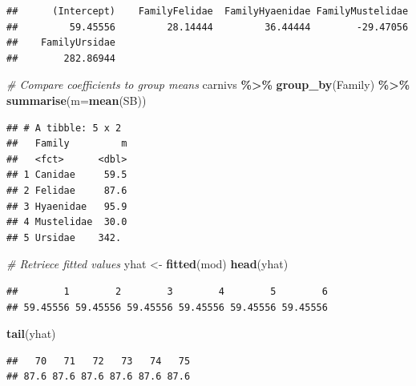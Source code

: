 \documentclass[
]{article}
\newenvironment{Shaded}{\begin{snugshade}}{\end{snugshade}}
\newcommand{\AttributeTok}[1]{\textcolor[rgb]{0.13,0.29,0.53}{#1}}
\newcommand{\CommentTok}[1]{\textcolor[rgb]{0.56,0.35,0.01}{\textit{#1}}}
\newcommand{\FunctionTok}[1]{\textcolor[rgb]{0.13,0.29,0.53}{\textbf{#1}}}
\newcommand{\NormalTok}[1]{#1}
\newcommand{\OtherTok}[1]{\textcolor[rgb]{0.56,0.35,0.01}{#1}}
\newcommand{\SpecialCharTok}[1]{\textcolor[rgb]{0.81,0.36,0.00}{\textbf{#1}}}
\begin{document}
\begin{verbatim}
##      (Intercept)    FamilyFelidae  FamilyHyaenidae FamilyMustelidae 
##         59.45556         28.14444         36.44444        -29.47056 
##    FamilyUrsidae 
##        282.86944
\end{verbatim}

\begin{Shaded}
\begin{Highlighting}[]
\CommentTok{\# Compare coefficients to group means}
\NormalTok{carnivs }\SpecialCharTok{\%\textgreater{}\%}
    \FunctionTok{group\_by}\NormalTok{(Family) }\SpecialCharTok{\%\textgreater{}\%}
    \FunctionTok{summarise}\NormalTok{(}\AttributeTok{m=}\FunctionTok{mean}\NormalTok{(SB))}
\end{Highlighting}
\end{Shaded}

\begin{verbatim}
## # A tibble: 5 x 2
##   Family         m
##   <fct>      <dbl>
## 1 Canidae     59.5
## 2 Felidae     87.6
## 3 Hyaenidae   95.9
## 4 Mustelidae  30.0
## 5 Ursidae    342.
\end{verbatim}

\begin{Shaded}
\begin{Highlighting}[]
\CommentTok{\# Retriece fitted values}
\NormalTok{yhat }\OtherTok{\textless{}{-}} \FunctionTok{fitted}\NormalTok{(mod)}
\FunctionTok{head}\NormalTok{(yhat)}
\end{Highlighting}
\end{Shaded}

\begin{verbatim}
##        1        2        3        4        5        6 
## 59.45556 59.45556 59.45556 59.45556 59.45556 59.45556
\end{verbatim}

\begin{Shaded}
\begin{Highlighting}[]
\FunctionTok{tail}\NormalTok{(yhat)}
\end{Highlighting}
\end{Shaded}

\begin{verbatim}
##   70   71   72   73   74   75 
## 87.6 87.6 87.6 87.6 87.6 87.6
\end{verbatim}
\end{document}

